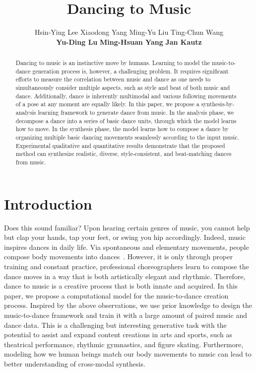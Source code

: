 \documentclass{article}
\newlength\secmargin
\begin{document}
\title{Dancing to Music}

\author{Hsin-Ying Lee \quad Xiaodong Yang \quad Ming-Yu Liu \quad Ting-Chun Wang 
\\ \textbf{Yu-Ding Lu} \quad \textbf{Ming-Hsuan Yang} \quad \textbf{Jan Kautz} \\
}



\maketitle

\begin{abstract}
Dancing to music is an instinctive move by humans.
Learning to model the music-to-dance generation process is, however, a challenging problem. 
It requires significant efforts to measure the correlation between music and dance as one needs to simultaneously consider multiple aspects, such as style and beat of both music and dance.
Additionally, dance is inherently multimodal and various following movements of a pose at any moment are equally likely.
In this paper, we propose a synthesis-by-analysis learning framework to generate dance from music.
In the analysis phase, we decompose a dance into a series of basic dance units, through which the model learns how to move.
In the synthesis phase, the model learns how to compose a dance by organizing multiple basic dancing movements seamlessly according to the input music. 
Experimental qualitative and quantitative results demonstrate that the proposed method can synthesize realistic, diverse, style-consistent, and beat-matching dances from music.
\end{abstract}




\section{Introduction}
\label{sec:introduction}
\vspace{\secmargin}
Does this sound familiar? Upon hearing certain genres of music, you cannot help but clap your hands, tap your feet, or swing you hip accordingly. 
Indeed, music inspires dances in daily life.  
Via spontaneous and elementary movements, people compose body movements into dances~\cite{music-dance-1, music-dance-2}. 
However, it is only through proper training and constant practice, professional choreographers learn to compose the dance moves in a way that is both artistically elegant and rhythmic. 
Therefore, dance to music is a creative process that is both innate and acquired.
In this paper, we propose a computational model for the music-to-dance creation process. Inspired by the above observations, we use prior knowledge to design the music-to-dance framework and train it with a large amount of paired music and dance data.
This is a challenging but interesting generative task with the potential to assist and expand content creations in arts and sports, such as theatrical performance, rhythmic gymnastics, and figure skating. Furthermore, modeling how we human beings match our body movements to music can lead to better understanding of cross-modal synthesis. 
\end{document}

